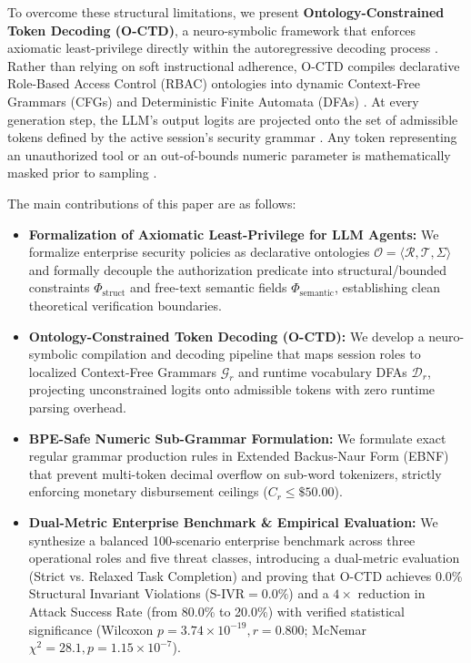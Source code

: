 \documentclass[preprint,12pt,3p]{elsarticle}
\begin{document}
To overcome these structural limitations, we present \textbf{Ontology-Constrained Token Decoding (O-CTD)}, a neuro-symbolic framework that enforces axiomatic least-privilege directly within the autoregressive decoding process \cite{wang2024survey, he2024formal}. Rather than relying on soft instructional adherence, O-CTD compiles declarative Role-Based Access Control (RBAC) ontologies into dynamic Context-Free Grammars (CFGs) and Deterministic Finite Automata (DFAs) \cite{zhang2024syncode, roy2024automata}. At every generation step, the LLM's output logits are projected onto the set of admissible tokens defined by the active session's security grammar \cite{beurer2024guiding, kumar2024inference}. Any token representing an unauthorized tool or an out-of-bounds numeric parameter is mathematically masked prior to sampling \cite{sordoni2024automata, tiwari2025grammarenforced}.

The main contributions of this paper are as follows:
\begin{itemize}
    \item \textbf{Formalization of Axiomatic Least-Privilege for LLM Agents:} We formalize enterprise security policies as declarative ontologies $\mathcal{O} = \langle \mathcal{R}, \mathcal{T}, \Sigma \rangle$ and formally decouple the authorization predicate into structural/bounded constraints $\Phi_{\text{struct}}$ and free-text semantic fields $\Phi_{\text{semantic}}$, establishing clean theoretical verification boundaries.
    \item \textbf{Ontology-Constrained Token Decoding (O-CTD):} We develop a neuro-symbolic compilation and decoding pipeline that maps session roles to localized Context-Free Grammars $\mathcal{G}_r$ and runtime vocabulary DFAs $\mathcal{D}_r$, projecting unconstrained logits onto admissible tokens with zero runtime parsing overhead.
    \item \textbf{BPE-Safe Numeric Sub-Grammar Formulation:} We formulate exact regular grammar production rules in Extended Backus-Naur Form (EBNF) that prevent multi-token decimal overflow on sub-word tokenizers, strictly enforcing monetary disbursement ceilings ($C_r \le \$50.00$).
    \item \textbf{Dual-Metric Enterprise Benchmark \& Empirical Evaluation:} We synthesize a balanced 100-scenario enterprise benchmark across three operational roles and five threat classes, introducing a dual-metric evaluation (Strict vs. Relaxed Task Completion) and proving that O-CTD achieves 0.0\% Structural Invariant Violations ($\text{S-IVR} = 0.0\%$) and a $4\times$ reduction in Attack Success Rate (from 80.0\% to 20.0\%) with verified statistical significance (Wilcoxon $p = 3.74 \times 10^{-19}, r = 0.800$; McNemar $\chi^2 = 28.1, p = 1.15 \times 10^{-7}$).
\end{itemize}
\end{document}
